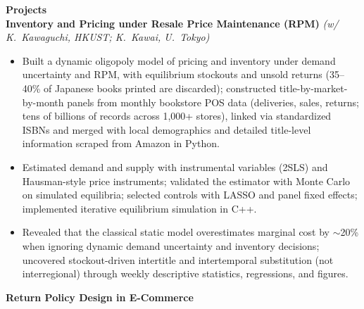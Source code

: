 \documentclass[11pt,letterpaper]{article}
\begin{document}
{\large \textbf{Projects}}\\[-0.5pt]
\textbf{Inventory and Pricing under Resale Price Maintenance (RPM)} \textit{(w/ K.\ Kawaguchi, HKUST; K.\ Kawai, U.\ Tokyo)}\\
\vspace{-6pt}
\begin{itemize}
  \item Built a dynamic oligopoly model of pricing and inventory under demand uncertainty and RPM, with equilibrium stockouts and unsold returns (35--40\% of Japanese books printed are discarded); constructed title-by-market-by-month panels from monthly bookstore POS data (deliveries, sales, returns; tens of billions of records across 1{,}000+ stores), linked via standardized ISBNs and merged with local demographics and detailed title-level information scraped from Amazon in Python.
  \item Estimated demand and supply with instrumental variables (2SLS) and Hausman-style price instruments; validated the estimator with Monte Carlo on simulated equilibria; selected controls with LASSO and panel fixed effects; implemented iterative equilibrium simulation in C++.
  \item Revealed that the classical static model overestimates marginal cost by \(\sim\)20\% when ignoring dynamic demand uncertainty and inventory decisions; uncovered stockout-driven intertitle and intertemporal substitution (not interregional) through weekly descriptive statistics, regressions, and figures.
\end{itemize}
\vspace{-3pt}
\textbf{Return Policy Design in E-Commerce}\\
\vspace{-6pt}
\end{document}
